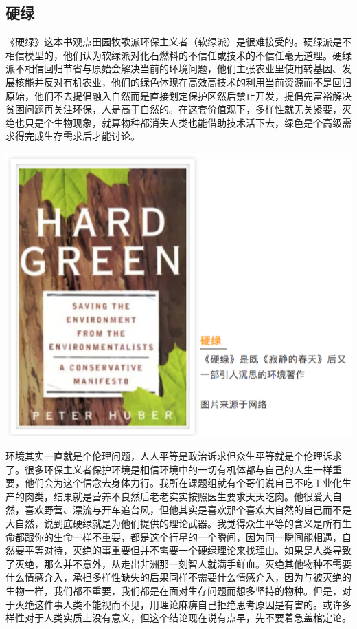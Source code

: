 \documentclass[]{book}
\begin{document}
\hypertarget{ux786cux7eff}{%
\subsection{硬绿}\label{ux786cux7eff}}

《硬绿》这本书观点田园牧歌派环保主义者（软绿派）是很难接受的。硬绿派是不相信模型的，他们认为软绿派对化石燃料的不信任或技术的不信任毫无道理。硬绿派不相信回归节省与原始会解决当前的环境问题，他们主张农业里使用转基因、发展核能并反对有机农业，他们的绿色体现在高效高技术的利用当前资源而不是回归原始，他们不去提倡融入自然而是直接划定保护区然后禁止开发，提倡先富裕解决贫困问题再关注环保，人是高于自然的。在这套价值观下，多样性就无关紧要，灭绝也只是个生物现象，就算物种都消失人类也能借助技术活下去，绿色是个高级需求得完成生存需求后才能讨论。

\includegraphics[width=8.33in]{images/miejue6}

环境其实一直就是个伦理问题，人人平等是政治诉求但众生平等就是个伦理诉求了。很多环保主义者保护环境是相信环境中的一切有机体都与自己的人生一样重要，他们会为这个信念去身体力行。我所在课题组就有个哥们说自己不吃工业化生产的肉类，结果就是营养不良然后老老实实按照医生要求天天吃肉。他很爱大自然，喜欢野营、漂流与开车追台风，但他其实是喜欢那个喜欢大自然的自己而不是大自然，说到底硬绿就是为他们提供的理论武器。我觉得众生平等的含义是所有生命都跟你的生命一样不重要，都是这个行星的一个瞬间，因为同一瞬间能相遇，自然要平等对待，灭绝的事重要但并不需要一个硬绿理论来找理由。如果是人类导致了灭绝，那么并不意外，从走出非洲那一刻智人就满手鲜血。灭绝其他物种不需要什么情感介入，承担多样性缺失的后果同样不需要什么情感介入，因为与被灭绝的生物一样，我们都不重要，我们都是在面对生存问题而想多坚持的物种。但是，对于灭绝这件事人类不能视而不见，用理论麻痹自己拒绝思考原因是有害的。或许多样性对于人类实质上没有意义，但这个结论现在说有点早，先不要着急盖棺定论。
\end{document}
